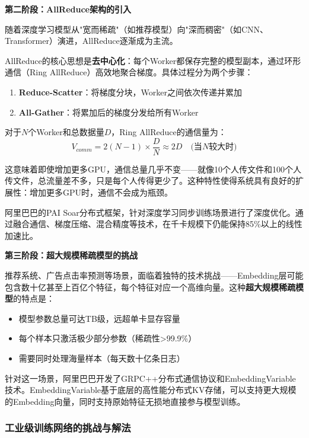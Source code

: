 \textbf{第二阶段：AllReduce架构的引入}

随着深度学习模型从"宽而稀疏"（如推荐模型）向"深而稠密"（如CNN、Transformer）演进，AllReduce逐渐成为主流。

AllReduce的核心思想是\textbf{去中心化}：每个Worker都保存完整的模型副本，通过环形通信（Ring AllReduce）高效地聚合梯度。具体过程分为两个步骤：

\begin{enumerate}
    \item \textbf{Reduce-Scatter}：将梯度分块，Worker之间依次传递并累加
    \item \textbf{All-Gather}：将累加后的梯度分发给所有Worker
\end{enumerate}

对于$N$个Worker和总数据量$D$，Ring AllReduce的通信量为：
\begin{equation}
V_{comm} = 2(N-1) \times \frac{D}{N} \approx 2D \quad \text{(当$N$较大时)}
\end{equation}

这意味着即使增加更多GPU，通信总量几乎不变——就像10个人传文件和100个人传文件，总流量差不多，只是每个人传得更少了。这种特性使得系统具有良好的扩展性：增加更多GPU时，通信不会成为瓶颈。

阿里巴巴的PAI Soar分布式框架，针对深度学习同步训练场景进行了深度优化。通过融合通信、梯度压缩、混合精度等技术，在千卡规模下仍能保持85\%以上的线性加速比。

\textbf{第三阶段：超大规模稀疏模型的挑战}

推荐系统、广告点击率预测等场景，面临着独特的技术挑战——Embedding层可能包含数十亿甚至上百亿个特征，每个特征对应一个高维向量。这种\textbf{超大规模稀疏模型}的特点是：

\begin{itemize}
    \item 模型参数总量可达TB级，远超单卡显存容量
    \item 每个样本只激活极少部分参数（稀疏性>99.9\%）
    \item 需要同时处理海量样本（每天数十亿条日志）
\end{itemize}

针对这一场景，阿里巴巴开发了GRPC++分布式通信协议和EmbeddingVariable技术。EmbeddingVariable基于底层的高性能分布式KV存储，可以支持更大规模的Embedding向量，同时支持原始特征无损地直接参与模型训练。

\subsubsection{工业级训练网络的挑战与解法}

